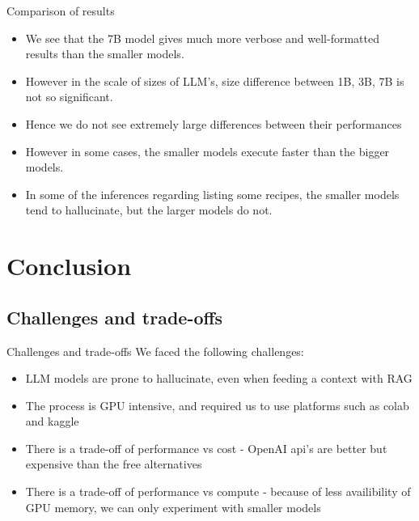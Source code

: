 \documentclass[10pt, t]{beamer}
\begin{document}
    \begin{frame}{Comparison of results}
        \begin{itemize}
            \item We see that the 7B model gives much more verbose and well-formatted results than the smaller models.
            \item However in the scale of sizes of LLM's, size difference between 1B, 3B, 7B is not so significant.
            \item Hence we do not see extremely large differences between their performances
            \item However in some cases, the smaller models execute faster than the bigger models.
            \item In some of the inferences regarding listing some recipes, the smaller models tend to hallucinate, but the larger models do not.
        \end{itemize}
    \end{frame}

    \section{Conclusion}
    \subsection{Challenges and trade-offs}
    \begin{frame}{Challenges and trade-offs}
        We faced the following challenges:
        \begin{itemize}
            \item LLM models are prone to hallucinate, even when feeding a context with RAG
            \item The process is GPU intensive, and required us to use platforms such as colab and kaggle
            \item There is a trade-off of performance vs cost - OpenAI api's are better but expensive than the free alternatives
            \item There is a trade-off of performance vs compute - because of less availibility of GPU memory, we can only experiment with smaller models
        \end{itemize}
    \end{frame}
\end{document}
